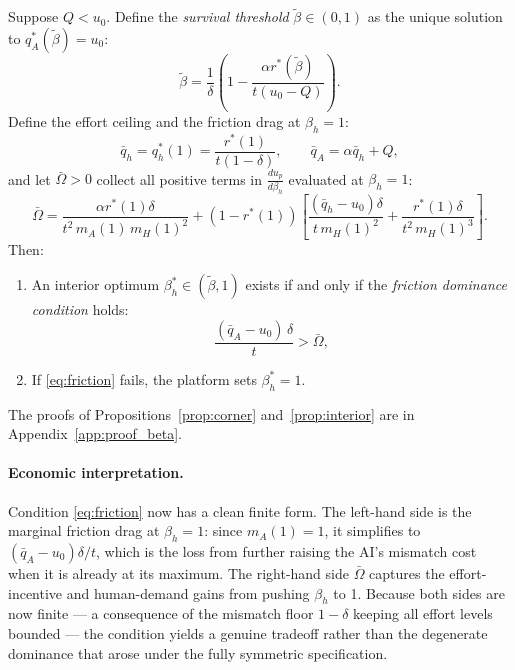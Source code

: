 \documentclass[mnsc,nonblindrev]{informs3_NoOR}
\begin{document}
\begin{proposition}
\label{prop:interior}
Suppose $Q < u_0$. Define the \emph{survival threshold} $\tilde\beta \in (0,1)$ as the unique solution to $q_A^*(\tilde\beta) = u_0$:
\begin{equation}
    \tilde\beta = \frac{1}{\delta}\left(1 - \frac{\alpha r^*(\tilde\beta)}{t(u_0-Q)}\right).
    \label{eq:betaTilde}
\end{equation}
Define the effort ceiling and the friction drag at $\beta_h = 1$:
\begin{equation}
    \bar{q}_h = q_h^*(1) = \frac{r^*(1)}{t(1-\delta)}, \qquad
    \bar{q}_A = \alpha\bar{q}_h + Q,
    \label{eq:ceilings}
\end{equation}
and let $\bar\Omega > 0$ collect all positive terms in $\tfrac{du_p}{d\beta_h}$ evaluated at $\beta_h = 1$:
\begin{equation}
    \bar\Omega = \frac{\alpha r^*(1)\delta}{t^2\,m_A(1)\,m_H(1)^2} + (1-r^*(1))\left[\frac{(\bar{q}_h - u_0)\delta}{t\,m_H(1)^2} + \frac{r^*(1)\delta}{t^2\,m_H(1)^3}\right].
    \label{eq:Omega}
\end{equation}
Then:
\begin{enumerate}[label=(\roman*)]
    \item An interior optimum $\beta_h^* \in (\tilde\beta, 1)$ exists if and only if the \emph{friction dominance condition} holds:
    \begin{equation}
        \frac{(\bar{q}_A - u_0)\,\delta}{t} > \bar\Omega,
        \label{eq:friction}
    \end{equation}
    \item If \eqref{eq:friction} fails, the platform sets $\beta_h^* = 1$.
\end{enumerate}
\end{proposition}

\noindent The proofs of Propositions~\ref{prop:corner} and~\ref{prop:interior} are in Appendix~\ref{app:proof_beta}.

\paragraph{Economic interpretation.} Condition \eqref{eq:friction} now has a clean finite form. The left-hand side is the marginal friction drag at $\beta_h = 1$: since $m_A(1) = 1$, it simplifies to $(\bar{q}_A - u_0)\delta/t$, which is the loss from further raising the AI's mismatch cost when it is already at its maximum. The right-hand side $\bar\Omega$ captures the effort-incentive and human-demand gains from pushing $\beta_h$ to 1. Because both sides are now finite — a consequence of the mismatch floor $1-\delta$ keeping all effort levels bounded — the condition yields a genuine tradeoff rather than the degenerate dominance that arose under the fully symmetric specification.
\end{document}
